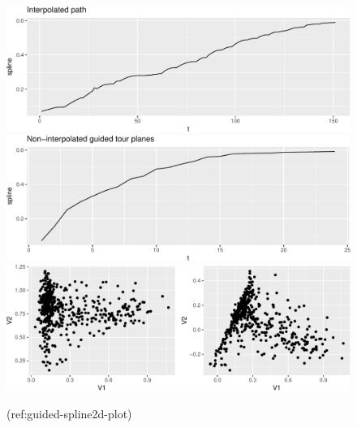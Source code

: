 \documentclass[article]{jss}
\begin{document}
\begin{CodeChunk}
\begin{figure}

{\centering \includegraphics[width=\textwidth]{figure/guided-spline2d-plot-1} \includegraphics[width=\textwidth]{figure/guided-spline2d-plot-2} \includegraphics[width=\textwidth]{figure/guided-spline2d-plot-3} 

}

\caption[(ref:guided-spline2d-plot)]{(ref:guided-spline2d-plot)}\label{fig:guided-spline2d-plot}
\end{figure}
\end{CodeChunk}
\end{document}
